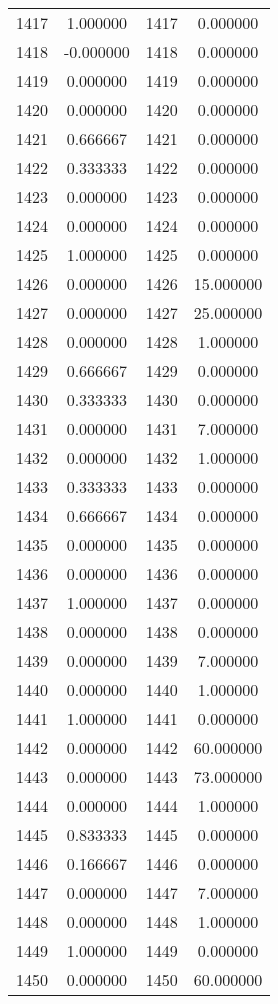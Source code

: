 \documentclass[12pt]{article}
\begin{document}
\begin{longtable}{@{}cccc@{}}
1417 & 1.000000 & 1417 & 0.000000 \\
1418 & -0.000000 & 1418 & 0.000000 \\
1419 & 0.000000 & 1419 & 0.000000 \\
1420 & 0.000000 & 1420 & 0.000000 \\
1421 & 0.666667 & 1421 & 0.000000 \\
1422 & 0.333333 & 1422 & 0.000000 \\
1423 & 0.000000 & 1423 & 0.000000 \\
1424 & 0.000000 & 1424 & 0.000000 \\
1425 & 1.000000 & 1425 & 0.000000 \\
1426 & 0.000000 & 1426 & 15.000000 \\
1427 & 0.000000 & 1427 & 25.000000 \\
1428 & 0.000000 & 1428 & 1.000000 \\
1429 & 0.666667 & 1429 & 0.000000 \\
1430 & 0.333333 & 1430 & 0.000000 \\
1431 & 0.000000 & 1431 & 7.000000 \\
1432 & 0.000000 & 1432 & 1.000000 \\
1433 & 0.333333 & 1433 & 0.000000 \\
1434 & 0.666667 & 1434 & 0.000000 \\
1435 & 0.000000 & 1435 & 0.000000 \\
1436 & 0.000000 & 1436 & 0.000000 \\
1437 & 1.000000 & 1437 & 0.000000 \\
1438 & 0.000000 & 1438 & 0.000000 \\
1439 & 0.000000 & 1439 & 7.000000 \\
1440 & 0.000000 & 1440 & 1.000000 \\
1441 & 1.000000 & 1441 & 0.000000 \\
1442 & 0.000000 & 1442 & 60.000000 \\
1443 & 0.000000 & 1443 & 73.000000 \\
1444 & 0.000000 & 1444 & 1.000000 \\
1445 & 0.833333 & 1445 & 0.000000 \\
1446 & 0.166667 & 1446 & 0.000000 \\
1447 & 0.000000 & 1447 & 7.000000 \\
1448 & 0.000000 & 1448 & 1.000000 \\
1449 & 1.000000 & 1449 & 0.000000 \\
1450 & 0.000000 & 1450 & 60.000000 \\

\end{longtable}
\end{document}
